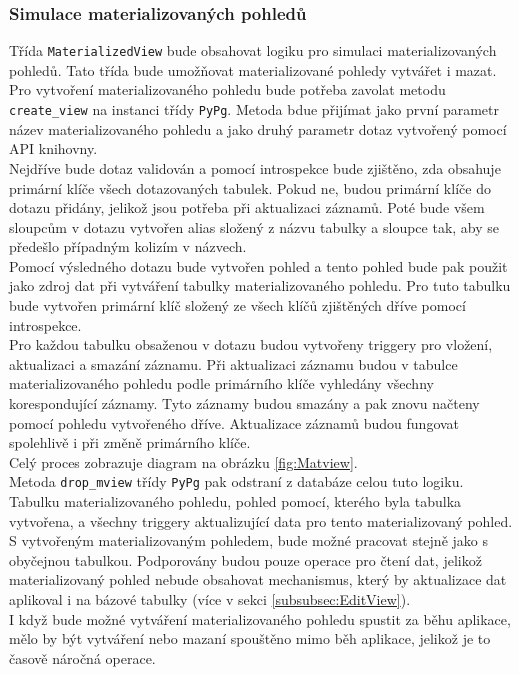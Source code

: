 \documentclass[ing,male,java,dept456]{diploma}						%
\begin{document}
\subsubsection{Simulace materializovaných pohledů}

Třída \lstinline[style=inlinepython]|MaterializedView| bude obsahovat logiku pro simulaci materializovaných pohledů. Tato třída bude umožňovat materializované pohledy vytvářet i mazat. Pro vytvoření materializovaného pohledu bude potřeba zavolat metodu \lstinline[style=inlinepython]|create_view| na instanci třídy \lstinline[style=inlinepython]|PyPg|. Metoda bdue přijímat jako první parametr název materializovaného pohledu a jako druhý parametr dotaz vytvořený pomocí API knihovny. \\
Nejdříve bude dotaz validován a pomocí introspekce bude zjištěno, zda obsahuje primární klíče všech dotazovaných tabulek. Pokud ne, budou primární klíče do dotazu přidány, jelikož jsou potřeba při aktualizaci záznamů. Poté bude všem sloupcům v dotazu vytvořen alias složený z názvu tabulky a sloupce tak, aby se předešlo případným kolizím v názvech. \\
Pomocí výsledného dotazu bude vytvořen pohled a tento pohled bude pak použit jako zdroj dat při vytváření tabulky materializovaného pohledu. Pro tuto tabulku bude vytvořen primární klíč složený ze všech klíčů zjištěných dříve pomocí introspekce. \\
Pro každou tabulku obsaženou v dotazu budou vytvořeny triggery pro vložení, aktualizaci a smazání záznamu. Při aktualizaci záznamu budou v tabulce materializovaného pohledu podle primárního klíče vyhledány všechny korespondující záznamy. Tyto záznamy budou smazány a pak znovu načteny pomocí pohledu vytvořeného dříve. Aktualizace záznamů budou fungovat spolehlivě i při změně primárního klíče. \\
Celý proces zobrazuje diagram na obrázku \ref{fig:Matview}. \\
Metoda \lstinline[style=inlinepython]|drop_mview| třídy \lstinline[style=inlinepython]|PyPg| pak odstraní z databáze celou tuto logiku. Tabulku materializovaného pohledu, pohled pomocí, kterého byla tabulka vytvořena, a všechny triggery aktualizující data pro tento materializovaný pohled. \\
S vytvořeným materializovaným pohledem, bude možné pracovat stejně jako s obyčejnou tabulkou. Podporovány budou pouze operace pro čtení dat, jelikož materializovaný pohled nebude obsahovat mechanismus, který by aktualizace dat aplikoval i na bázové tabulky (více v sekci \ref{subsubsec:EditView}). \\
I když bude možné vytváření materializovaného pohledu spustit za běhu aplikace, mělo by být vytváření nebo mazaní spouštěno mimo běh aplikace, jelikož je to časově náročná operace. \\
\end{document}
